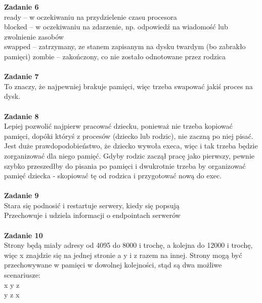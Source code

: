 \documentclass[12pt, a4paper, polish, openany]{book}
\begin{document}
\textbf{Zadanie 6} \\
ready – w oczekiwaniu na przydzielenie czasu procesora \\
blocked – w oczekiwaniu na zdarzenie, np. odpowiedź na wiadomość lub zwolnienie zasobów \\
swapped – zatrzymany, ze stanem zapisanym na dysku twardym (bo zabrakło pamięci)
zombie – zakończony, co nie zostało odnotowane przez rodzica \\\\
\textbf{Zadanie 7} \\
To znaczy, że najpewniej brakuje pamięci, więc trzeba swapować jakiś proces na dysk. \\\\
\textbf{Zadanie 8} \\
Lepiej pozwolić najpierw pracować dziecku, ponieważ nie trzeba kopiować pamięci, dopóki któryś z procesów (dziecko lub rodzic), nie zaczną po niej pisać. Jest duże prawdopodobieństwo, że dziecko wywoła execa, więc i tak trzeba będzie zorganizować dla niego pamięć. Gdyby rodzic zaczął pracę jako pierwszy, pewnie szybko przeszedłby do pisania po pamięci i dwukrotnie trzeba by organizować pamięć dziecka - skopiować tę od rodzica i przygotować nową do exec. \\\\
\textbf{Zadanie 9} \\
Stara się podnosić i restartuje serwery, kiedy się popsują \\
Przechowuje i udziela informacji o endpointach serwerów \\\\
\textbf{Zadanie 10} \\
Strony będą miały adresy od 4095 do 8000 i trochę, a kolejna do 12000 i trochę, więc x znajdzie się na jednej stronie a y i z razem na innej. Strony mogą być przechowywane w pamięci w dowolnej kolejności, stąd są dwa możliwe scenariusze: \\
x y z \\
y z x \\\\
\end{document}
